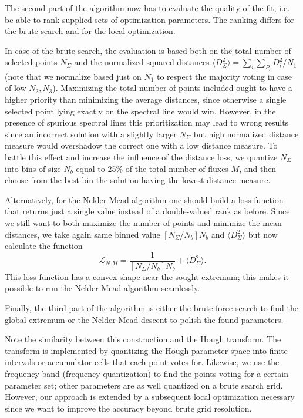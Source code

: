 \documentclass[%
 aip,
 amsmath,amssymb,
 reprint,%
]{revtex4-1}
\begin{document}
The second part of the algorithm now has to evaluate the quality of the fit, i.e. be able to rank supplied sets of optimization parameters. The ranking differs for the brute search and for the local optimization. 

In case of the brute search, the evaluation is based both on the total number of selected points $N_\Sigma$ and the normalized squared distances $\langle D_\Sigma^2 \rangle  = {\sum_i \sum_{P_i} D_i^2/N_1}$ (note that we normalize based just on $N_1$ to respect the majority voting in case of low $N_2, N_3$). Maximizing the total number of points included ought to have a higher priority than minimizing the average distances, since otherwise a single selected point lying exactly on the spectral line would win. However, in the presence of spurious spectral lines this prioritization may lead to wrong results since an incorrect solution with a slightly larger $N_\Sigma$ but high normalized distance measure would overshadow the correct one with a low distance measure. To battle this effect and increase the influence of the distance loss, we quantize $N_\Sigma$ into bins of size $N_b$ equal to 25\% of the total number of fluxes $M$, and then choose from the best bin the solution having the lowest distance measure. 

Alternatively, for the Nelder-Mead algorithm one should build a loss function that returns just a single value instead of a double-valued rank as before. Since we still want to both maximize the number of points and minimize the mean distances, we take again same binned value $[N_\Sigma/N_b]N_b$ and $\langle D_\Sigma^2 \rangle$ but now calculate the function
\begin{equation}
\mathcal{L}_{N\text{-}M} = \frac{1}{[N_\Sigma/N_b]N_b} + \langle D_\Sigma^2 \rangle.
\end{equation}
This loss function has a convex shape near the sought extremum; this makes it possible to run the Nelder-Mead algorithm seamlessly.
  
Finally, the third part of the algorithm is either the brute force search to find the global extremum or the Nelder-Mead descent to polish the found parameters.

Note the similarity between this construction and the Hough transform. The transform is implemented by quantizing the Hough parameter space into finite intervals or accumulator cells that each point votes for. Likewise, we use the frequency band (frequency quantization) to find the points voting for a certain parameter set; other parameters are as well quantized on a brute search grid. However, our approach is extended by a subsequent local optimization necessary since we want to improve the accuracy beyond brute grid resolution.
\end{document}
